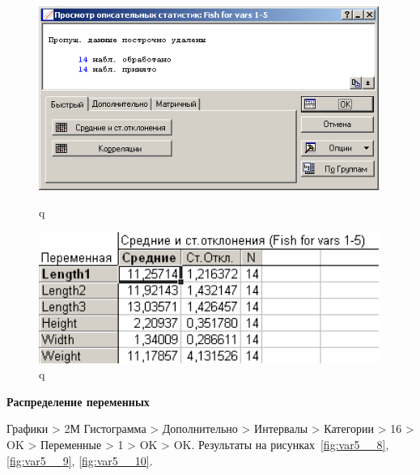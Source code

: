 \begin{figure}[!h]
  \centering
  \begin{minipage}{0.49\textwidth}
    \centering

    \includegraphics[width=0.99\textwidth]
    {inc/var5__6.PNG}

    \caption{q}
    \label{fig:var5__6}
  \end{minipage}
  \begin{minipage}{0.49\textwidth}
    \centering

    \includegraphics[width=0.99\textwidth]
    {inc/var5__7.PNG}

    \caption{q}
    \label{fig:var5__7}
  \end{minipage}
\end{figure}

\newpage

\begin{center}
  \textbf{Распределение переменных}
\end{center}

Графики > 2М Гистограмма > Дополнительно > Интервалы > Категории > 16 > OK
> Переменные > 1 > OK > OK. Результаты на рисунках~\ref{fig:var5__8}, \ref{fig:var5__9}, \ref{fig:var5__10}.

